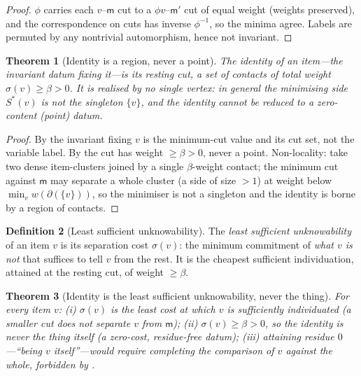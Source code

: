 \documentclass[twocolumn,11pt,a4paper]{article}
\theoremstyle{sup}
\newtheorem{theorem}{Theorem}[section]
\theoremstyle{definition}
\newtheorem{definition}[theorem]{Definition}
\theoremstyle{remark}
\newcommand{\wt}{w}
\newcommand{\med}{\mathsf{m}}
\newcommand{\flo}{\beta}
\newcommand{\cut}{\partial}
\newcommand{\str}{\sigma}
\begin{document}
\begin{proof}
$\phi$ carries each $v$--$\med$ cut to a $\phi v$--$\med'$ cut of equal weight
(weights preserved), and the correspondence on cuts has inverse $\phi^{-1}$, so
the minima agree. Labels are permuted by any nontrivial automorphism, hence not
invariant.
\end{proof}

\begin{theorem}[Identity is a region, never a point]
\label{thm:region}
The identity of an item---the invariant datum fixing it---is its resting cut, a
set of contacts of total weight $\str(v)\ge\flo>0$. It is realised by no single
vertex: in general the minimising side $S^\ast(v)$ is not the singleton
$\{v\}$, and the identity cannot be reduced to a zero-content (point) datum.
\end{theorem}

\begin{proof}
By  the invariant fixing $v$ is the minimum-cut value and
its cut set, not the variable label. By  the cut has weight
$\ge\flo>0$, never a point. Non-locality: take two dense item-clusters joined by
a single $\flo$-weight contact; the minimum cut against $\med$ may separate a
whole cluster (a side of size $>1$) at weight below $\min_v\wt(\cut(\{v\}))$, so
the minimiser is not a singleton and the identity is borne by a region of
contacts.
\end{proof}

\begin{definition}[Least sufficient unknowability]
\label{def:lsu}
The \emph{least sufficient unknowability} of an item $v$ is its separation cost
$\str(v)$: the minimum commitment of \emph{what $v$ is not} that suffices to
tell $v$ from the rest. It is the cheapest sufficient individuation, attained at
the resting cut, of weight $\ge\flo$.
\end{definition}

\begin{theorem}[Identity is the least sufficient unknowability, never the thing]
\label{thm:lsu}
For every item $v$: \textup{(i)} $\str(v)$ is the least cost at which $v$ is
sufficiently individuated (a smaller cut does not separate $v$ from $\med$);
\textup{(ii)} $\str(v)\ge\flo>0$, so the identity is never the thing itself (a
zero-cost, residue-free datum); \textup{(iii)} attaining residue $0$---``being
$v$ itself''---would require completing the comparison of $v$ against the whole,
forbidden by .
\end{theorem}
\end{document}
